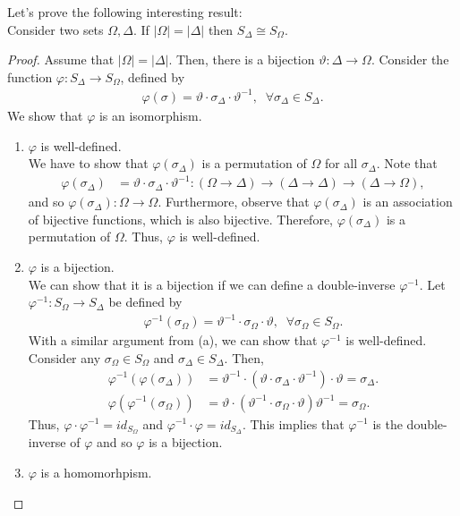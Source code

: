 \documentclass[12pt]{article}
\newenvironment{problem}[2][Problem]{\begin{trivlist} \item[\hskip \labelsep {\bfseries #1}\hskip \labelsep {\bfseries #2.}]}{\end{trivlist}}
\begin{document}
\begin{problem}{10}
  Let's prove the following interesting result:\\

  Consider two sets $\Omega, \Delta$. If $|\Omega|=|\Delta|$ then $S_{\Delta} \cong S_{\Omega}$. 
\begin{proof}
  Assume that $|\Omega|=|\Delta|$. Then, there is a bijection $\vartheta: \Delta \to \Omega$. Consider the function $\varphi: S_{\Delta} \to S_{\Omega}$, defined by
\begin{align*}
  \varphi(\sigma) = \vartheta\cdot \sigma_{\Delta} \cdot \vartheta^{-1}, \;\; \forall \sigma_{\Delta}\in S_{\Delta}.
\end{align*}
We show that $\varphi$ is an isomorphism.
\begin{enumerate}
  \item $\varphi$ is well-defined.\\

    We have to show that $\varphi(\sigma_{\Delta})$ is a permutation of $\Omega$ for all $\sigma_{\Delta}$. Note that 
\begin{align*}
  \varphi(\sigma_{\Delta}) &= \vartheta \cdot \sigma_{\Delta}\cdot \vartheta^{-1} : \left( \Omega \to \Delta \right) \to \left( \Delta \to  \Delta \right) \to \left( \Delta \to \Omega \right),
\end{align*}
and so $\varphi(\sigma_{\Delta}):\Omega\to \Omega$. Furthermore, observe that $\varphi(\sigma_{\Delta})$ is an association of bijective functions, which is also bijective. Therefore, $\varphi(\sigma_{\Delta})$ is a permutation of $\Omega$. Thus, $\varphi$ is well-defined.

  \item $\varphi$ is a bijection.\\

  We can show that it is a bijection if we can define a double-inverse $\varphi^{-1}$. Let $\varphi^{-1}:S_{\Omega}\to S_{\Delta}$ be defined by 
\begin{align*}
  \varphi^{-1}(\sigma_{\Omega}) = \vartheta^{-1} \cdot \sigma_{\Omega} \cdot \vartheta, \;\; \forall \sigma_{\Omega} \in S_{\Omega}.
\end{align*}
With a similar argument from (a), we can show that $\varphi^{-1}$ is well-defined. Consider any $\sigma_{\Omega}\in S_{\Omega}$ and $\sigma_{\Delta}\in S_{\Delta}$. Then,
\begin{align*}
  \varphi^{-1}\left( \varphi(\sigma_{\Delta}) \right) &= \vartheta^{-1} \cdot \left( \vartheta \cdot \sigma_{\Delta}\cdot \vartheta^{-1} \right)\cdot \vartheta = \sigma_{\Delta}.\\
  \varphi \left( \varphi^{-1}\left( \sigma_{\Omega} \right) \right) &= \vartheta \cdot \left( \vartheta^{-1}\cdot \sigma_{\Omega}\cdot \vartheta \right)\vartheta^{-1} = \sigma_{\Omega}.
\end{align*}
Thus, $\varphi\cdot \varphi^{-1} = id_{S_{\Omega}}$ and $\varphi^{-1} \cdot \varphi = id_{S_{\Delta}}$. This implies that $\varphi^{-1}$ is the double-inverse of $\varphi$ and so $\varphi$ is a bijection.
  \item $\varphi$ is a homomorhpism.\\


\end{enumerate}
\end{proof}
\end{problem}
\end{document}
